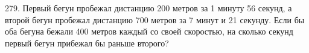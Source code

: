 279. Первый бегун пробежал дистанцию 200 метров за 1 минуту 56 секунд, а второй бегун пробежал дистанцию 700 метров за 7 минут и 21 секунду. Если бы оба бегуна бежали 400 метров каждый со своей скоростью, на сколько секунд первый бегун прибежал бы раньше второго?\\
